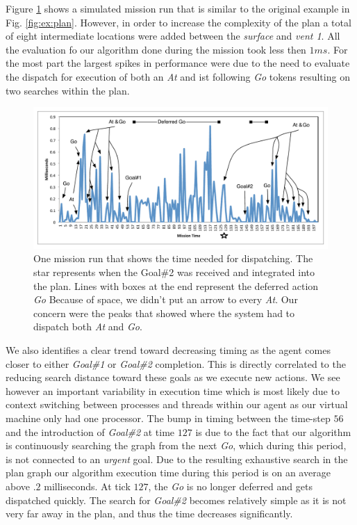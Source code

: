 Figure \ref{fig:example_run} shows a simulated mission run that is
similar to the original example in Fig. \ref{fig:ex:plan}.  However,
in order to increase the complexity of the plan a total of eight
intermediate locations were added between the {\em surface} and {\em
  vent 1}. All the evaluation fo our algorithm done during the mission
took less then $1ms$. For the most part the largest spikes in
performance were due to the need to evaluate the dispatch for
execution of both an {\em At} and ist following {\em Go} tokens
resulting on two searches within the plan.

\begin{figure}[b]
  \centering
  \includegraphics[width=\columnwidth]{figs/example_run.pdf}
  \caption{\small One mission run that shows the time needed for
    dispatching. The star represents when the Goal\#2 was received and
    integrated into the plan. Lines with boxes at the end represent
    the deferred action {\em Go} Because of space, we didn't put an
    arrow to every {\em At}. Our concern were the peaks that showed
    where the system had to dispatch both {\em At} and {\em Go}. }
  \label{fig:example_run}
\end{figure}

We also identifies a clear trend toward decreasing timing as the agent
comes closer to either {\em Goal\#1} or {\em Goal\#2} completion. This
is directly correlated to the reducing search distance toward these
goals as we execute new actions.  We see however an important
variability in execution time which is most likely due to context
switching between processes and threads within our agent as our
virtual machine only had one processor.  The bump in timing between
the time-step $56$ and the introduction of {\em Goal\#2} at time $127$
is due to the fact that our algorithm is continuously searching the
graph from the next {\em Go}, which during this period, is not
connected to an {\em urgent} goal. Due to the resulting exhaustive
search in the plan graph our algorithm execution time during this
period is on an average above $.2$ milliseconds. At tick $127$, the
{\em Go} is no longer deferred and gets dispatched quickly. The search
for {\em Goal\#2} becomes relatively simple as it is not very far away
in the plan, and thus the time decreases significantly.

